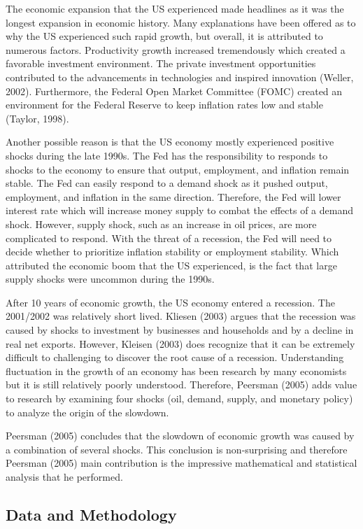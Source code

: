 \documentclass[11pt,preprint, authoryear]{elsarticle}
\numberwithin{equation}{section}
\numberwithin{figure}{section}
\numberwithin{table}{section}
\begin{document}
The economic expansion that the US experienced made headlines as it was
the longest expansion in economic history. Many explanations have been
offered as to why the US experienced such rapid growth, but overall, it
is attributed to numerous factors. Productivity growth increased
tremendously which created a favorable investment environment. The
private investment opportunities contributed to the advancements in
technologies and inspired innovation (Weller, 2002). Furthermore, the
Federal Open Market Committee (FOMC) created an environment for the
Federal Reserve to keep inflation rates low and stable (Taylor, 1998).

Another possible reason is that the US economy mostly experienced
positive shocks during the late 1990s. The Fed has the responsibility to
responds to shocks to the economy to ensure that output, employment, and
inflation remain stable. The Fed can easily respond to a demand shock as
it pushed output, employment, and inflation in the same direction.
Therefore, the Fed will lower interest rate which will increase money
supply to combat the effects of a demand shock. However, supply shock,
such as an increase in oil prices, are more complicated to respond. With
the threat of a recession, the Fed will need to decide whether to
prioritize inflation stability or employment stability. Which attributed
the economic boom that the US experienced, is the fact that large supply
shocks were uncommon during the 1990s.

After 10 years of economic growth, the US economy entered a recession.
The 2001/2002 was relatively short lived. Kliesen (2003) argues that the
recession was caused by shocks to investment by businesses and
households and by a decline in real net exports. However, Kleisen (2003)
does recognize that it can be extremely difficult to challenging to
discover the root cause of a recession. Understanding fluctuation in the
growth of an economy has been research by many economists but it is
still relatively poorly understood. Therefore, Peersman (2005) adds
value to research by examining four shocks (oil, demand, supply, and
monetary policy) to analyze the origin of the slowdown.

Peersman (2005) concludes that the slowdown of economic growth was
caused by a combination of several shocks. This conclusion is
non-surprising and therefore Peersman (2005) main contribution is the
impressive mathematical and statistical analysis that he performed.

\hypertarget{data-and-methodology}{%
\subsection{Data and Methodology}\label{data-and-methodology}}
\end{document}
